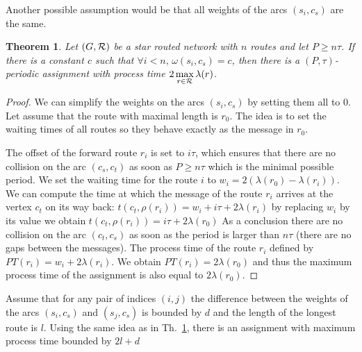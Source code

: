 \documentclass[10pt, conference, letterpaper]{IEEEtran}
\newtheorem{theorem}{Theorem}
\begin{document}
	Another possible assumption would be that all weights of the arcs $(s_i,c_s)$ are the same.
	
	 \begin{theorem}\label{th:asym}
	 Let $(G,{\cal R})$ be a star routed network with $n$ routes and let $P \geq n\tau$. If there is a constant $c$ such that $\forall i < n, \,\omega(s_i,c_s) = c$, then there is a $(P,\tau)$-periodic assignment with process time $2\, \displaystyle{\max_{r\in {\cal R}} \lambda(r)}$.
	 \end{theorem}
      \begin{proof}
      
        We can simplify the weights on the arcs $(s_i,c_s)$ by setting them all to $0$.
        Let assume that the route with maximal length is $r_0$. The idea is to 
        set the waiting times of all routes so they behave exactly as the message in $r_0$.
        
        The offset of the forward route $r_i$ is set to $i\tau$, which ensures that there are no collision on the arc $(c_s,c_t)$ as soon as $P \geq n\tau$ which is the minimal possible period. We set the waiting time for the route $i$ to $w_i = 2(\lambda(r_{0}) - \lambda(r_{i}))$. We can compute the time at which the message of the route $r_i$ arrives at the vertex $c_t$ on its way back: $t(c_t,\rho(r_i)) = w_i + i\tau + 2\lambda(r_{i})$
        by replacing $w_i$ by its value we obtain $t(c_t,\rho(r_i)) =  i\tau + 2\lambda(r_{0})$
        As a conclusion there are no collision on the arc $(c_t,c_s)$ as soon as the 
        period is larger than $n\tau$ (there are no gaps between the messages).
        The process time of the route $r_i$ defined by $PT(r_i) = w_i + 2\lambda(r_{i}) $. We obtain $PT(r_i) = 2\lambda(r_{0})$ and thus the maximum process time of the assignment is also equal to $2\lambda(r_0)$.
     \end{proof}
     
     Assume that for any pair of indices $(i,j)$ the difference between the weights of the arcs $(s_i,c_s)$ and $(s_j,c_s)$ is bounded by $d$ and the length of the longest route is $l$. Using the same idea as in Th.~\ref{th:asym}, there is an assignment with maximum process time bounded by  $2l + d$
     
\end{document}
